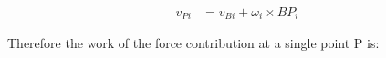 \begin{equation}
    \begin{split}
        v_{Pi} &= v_{Bi} + \omega_i \times BP_i
    \end{split}
\end{equation}

Therefore the work of the force contribution at a single point P is:


